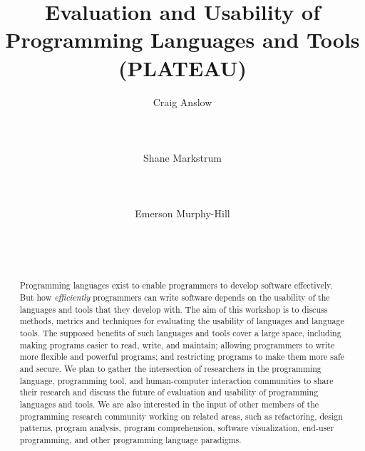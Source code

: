 \documentclass{sigplanconf}
\begin{document}
\title{Evaluation and Usability of Programming Languages and Tools (PLATEAU)}

\author{
\alignauthor Craig Anslow\\
       \\
       \\
       \\
\alignauthor Shane Markstrum\\
       \\
       \\
       \\
\alignauthor Emerson Murphy-Hill\\
       \\
       \\
       \\
       }

\date{}

\maketitle
\begin{abstract}

  Programming languages exist to enable programmers to develop
  software effectively.  But how \emph{efficiently} programmers can
  write software depends on the usability of the languages and tools
  that they develop with.  The aim of this workshop is to discuss
  methods, metrics and techniques for evaluating the usability of
  languages and language tools.  The supposed benefits of such
  languages and tools cover a large space, including making programs
  easier to read, write, and maintain; allowing programmers to write
  more flexible and powerful programs; and restricting programs to
  make them more safe and secure. We plan to gather the intersection
  of researchers in the programming language, programming tool, and
  human-computer interaction communities to share their research and
  discuss the future of evaluation and usability of programming
  languages and tools. We are also interested in the input of other
  members of the programming research community working on related
  areas, such as refactoring, design patterns, program analysis,
  program comprehension, software visualization, end-user programming,
  and other programming language paradigms.

\end{abstract}
\end{document}
